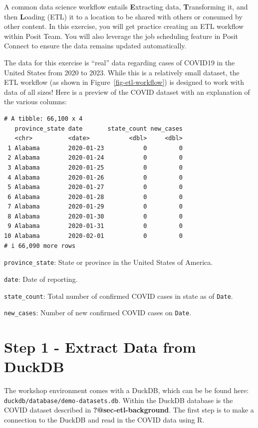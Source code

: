 \documentclass[
  letterpaper,
  DIV=11,
  numbers=noendperiod]{scrreprt}
\begin{document}
A common data science workflow entails \textbf{E}xtracting data,
\textbf{T}ransforming it, and then \textbf{L}oading (ETL) it to a
location to be shared with others or consumed by other content. In this
exercise, you will get practice creating an ETL workflow within Posit
Team. You will also leverage the job scheduling feature in Posit Connect
to ensure the data remains updated automatically.

The data for this exercise is ``real'' data regarding cases of COVID19
in the United States from 2020 to 2023. While this is a relatively small
dataset, the ETL workflow (as shown in Figure~\ref{fig-etl-workflow}) is
designed to work with data of all sizes! Here is a preview of the COVID
dataset with an explanation of the various columns:

\begin{verbatim}
# A tibble: 66,100 x 4
   province_state date       state_count new_cases
   <chr>          <date>           <dbl>     <dbl>
 1 Alabama        2020-01-23           0         0
 2 Alabama        2020-01-24           0         0
 3 Alabama        2020-01-25           0         0
 4 Alabama        2020-01-26           0         0
 5 Alabama        2020-01-27           0         0
 6 Alabama        2020-01-28           0         0
 7 Alabama        2020-01-29           0         0
 8 Alabama        2020-01-30           0         0
 9 Alabama        2020-01-31           0         0
10 Alabama        2020-02-01           0         0
# i 66,090 more rows
\end{verbatim}

\texttt{province\_state}: State or province in the United States of
America.

\texttt{date}: Date of reporting.

\texttt{state\_count}: Total number of confirmed COVID cases in state as
of \texttt{Date}.

\texttt{new\_cases}: Number of new confirmed COVID cases on
\texttt{Date}.

\section{Step 1 - Extract Data from
DuckDB}\label{step-1---extract-data-from-duckdb}

The workshop environment comes with a DuckDB, which can be be found
here: \texttt{duckdb/database/demo-datasets.db}. Within the DuckDB
database is the COVID dataset described in
\textbf{?@sec-etl-background}. The first step is to make a connection to
the DuckDB and read in the COVID data using R.
\end{document}
